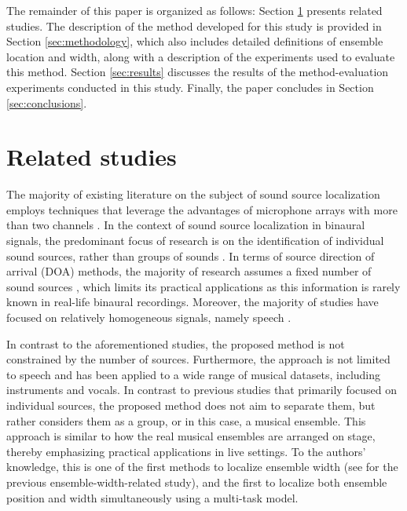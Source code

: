 \documentclass{article}
\begin{document}
The remainder of this paper is organized as follows: Section \ref{sec:related-studies} presents related studies. The description of the method developed for this study is provided in Section \ref{sec:methodology}, which also includes detailed definitions of ensemble location and width, along with a description of the experiments used to evaluate this method. Section \ref{sec:results} discusses the results of the method-evaluation experiments conducted in this study. Finally, the paper concludes in Section \ref{sec:conclusions}.

\section{Related studies}
\label{sec:related-studies}

The majority of existing literature on the subject of sound source localization employs techniques that leverage the advantages of microphone arrays with more than two channels \cite{kaveh_statistical_1986, pavlidi_real-time_2012, pan_multi-tone_2021, hahmann_sound_2022, chung_sound_2022, liu_sound_2022}. In the context of sound source localization in binaural signals, the predominant focus of research is on the identification of individual sound sources, rather than groups of sounds \cite{dietz_auditory_2011, may_probabilistic_2011, may_binaural_2012, woodruff_binaural_2012, may_robust_2015, ma16c_interspeech, ma_exploiting_2017, benaroya_binaural_2018}. In terms of source direction of arrival (DOA) methods, the majority of research assumes a fixed number of sound sources \cite{pang_multitask_2019, vecchiotti19, ma_exploiting_2017, woodruff_binaural_2012, s_spatiogram_2021}, which limits its practical applications as this information is rarely known in real-life binaural recordings. Moreover, the majority of studies have focused on relatively homogeneous signals, namely speech \cite{dietz_auditory_2011, may_probabilistic_2011, may_binaural_2012, woodruff_binaural_2012, may_robust_2015, ma16c_interspeech, ma_exploiting_2017, benaroya_binaural_2018, wang_binaural_2020, liu_multiple_2018, yang_deepear_2022, ma_robust_2018}.

In contrast to the aforementioned studies, the proposed method is not constrained by the number of sources. Furthermore, the approach is not limited to speech and has been applied to a wide range of musical datasets, including instruments and vocals. In contrast to previous studies that primarily focused on individual sources, the proposed method does not aim to separate them, but rather considers them as a group, or in this case, a musical ensemble. This approach is similar to how the real musical ensembles are arranged on stage, thereby emphasizing practical applications in live settings. To the authors' knowledge, this is one of the first methods to localize ensemble width (see \cite{antoniuk2023blind} for the previous ensemble-width-related study), and the first to localize both ensemble position and width simultaneously using a multi-task model.
\end{document}
